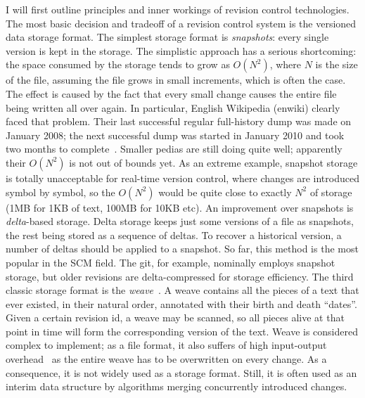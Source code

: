 \documentclass{sig-alternate}
\begin{document}
I will first outline principles and inner workings of revision control technologies.
The most basic decision and tradeoff of a revision control system is the versioned data storage format.
The simplest storage format is \emph{snapshots}: every single  version is kept in the storage.
The simplistic approach has a serious shortcoming: the space consumed by the storage tends to grow as $O(N^2)$, where $N$ is the size of the file, assuming the file grows in small increments, which is often the case.
The effect is caused by the fact that every small change causes the entire file being written all over again.
In particular, English Wikipedia (enwiki) clearly faced that problem. Their last successful regular full-history dump was made on January 2008; the next successful dump was started in January 2010 and took two months to complete~\cite{own-experience}.
Smaller pedias are still doing quite well; apparently their $O(N^2)$ is not out of bounds yet.
As an extreme example, snapshot storage is totally unacceptable for real-time version control, where changes are introduced symbol by symbol, so the $O(N^2)$ would be quite close to exactly $N^2$ of storage (1MB for 1KB of text, 100MB for 10KB etc).
An improvement over snapshots is \emph{delta}-based storage.
Delta storage keeps just some versions of a file as snapshots, the rest being stored as a sequence of deltas.
To recover a historical version, a number of deltas should be applied to a snapshot.
So far, this method is the most popular in the SCM field.
The git, for example, nominally employs snapshot storage, but older revisions are delta-compressed for storage efficiency. 
The third classic storage format is the  \emph{weave}~\cite{rcs-txt,revctrl-weave}. 
A weave contains all the pieces of a text that ever existed, in their natural order, annotated with their birth and death ``dates''.
Given a certain revision id, a weave may be scanned, so all pieces alive at that point in time will form the corresponding version of the text.
Weave is considered complex to implement; as a file format, it also suffers of high input-output overhead~\cite{bazaar-weave} as the entire weave has to be overwritten on every change.
As a consequence, it is not widely used as a storage format.
Still, it is often used as an interim data structure by algorithms merging concurrently introduced changes.
\end{document}
